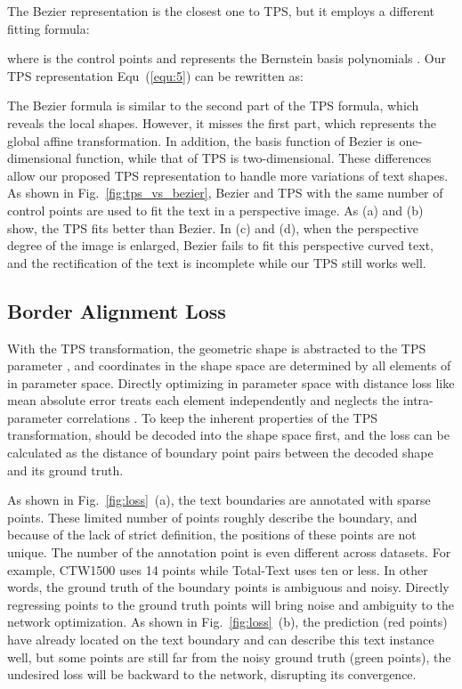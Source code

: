 \documentclass[sigconf]{acmart}
\begin{document}
	The Bezier \cite{Liu2020ABCNet, abcnetv2} representation is the closest one to TPS, but it employs a different fitting formula:
	
	where  is the  control points and  represents the Bernstein basis polynomials \cite{Liu2020ABCNet}. Our TPS representation Equ~(\ref{equ:5}) can be rewritten as:
	
	The Bezier formula is similar to the second part of the TPS formula, which reveals the local shapes. However, it misses the first part, which represents the global affine transformation. In addition, the basis function of Bezier  is one-dimensional function, while that of TPS  is two-dimensional. These differences allow our proposed TPS representation to handle more variations of text shapes. As shown in Fig.~\ref{fig:tps_vs_bezier}, Bezier and TPS with the same number of control points are used to fit the text in a perspective image. As (a) and (b) show, the TPS fits better than Bezier. In (c) and (d), when the perspective degree of the image is enlarged, 
	Bezier fails to fit this perspective curved text, and the rectification of the text is incomplete while our TPS still works well. 
	
	
	\subsection{Border Alignment Loss}
	With the TPS transformation, the geometric shape is abstracted to the TPS parameter , and coordinates in the shape space are determined by all elements of   in parameter space. Directly optimizing  in parameter space with distance loss like mean absolute error treats each element independently and neglects the intra-parameter correlations \cite{Wang2020textray}. To keep the inherent properties of the TPS transformation,
	 should be decoded into the shape space first, and the loss can be calculated as the distance of boundary point pairs between the decoded shape and its ground truth.
	
	As shown in Fig.~\ref{fig:loss}~(a), the text boundaries are annotated with sparse points. These limited number of points roughly describe the boundary, and because of the lack of strict definition, the positions of these points are not unique. The number of the annotation point is even different across datasets. For example, CTW1500 uses 14 points while Total-Text uses ten or less. In other words, the ground truth of the boundary points is ambiguous and noisy. Directly regressing points to the ground truth points will bring noise and ambiguity to the network optimization. As shown in Fig.~\ref{fig:loss}~(b), the prediction (red points) have already located on the text boundary and can describe this text instance well, but some points are still far from the noisy ground truth (green points), the undesired loss will be backward to the network, disrupting its convergence.
	
\end{document}

